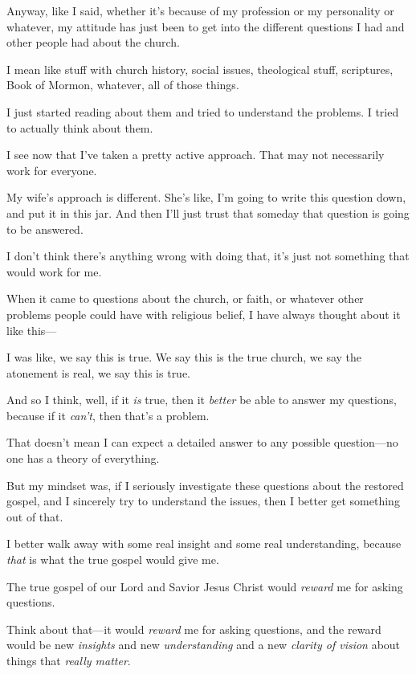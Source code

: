 \begin{compactitem}
			\item Anyway, like I said, whether it's because of my profession or my personality or whatever, my attitude has just been to get into the different questions I had and other people had about the church.
				\begin{compactitem}
					\item I mean like stuff with church history, social issues, theological stuff, scriptures, Book of Mormon, whatever, all of those things.
					\item I just started reading about them and tried to understand the problems. I tried to actually think about them.
					\item I see now that I've taken a pretty active approach. That may not necessarily work for everyone.
					\item My wife's approach is different. She's like, I'm going to write this question down, and put it in this jar. And then I'll just trust that someday that question is going to be answered.
					\item I don't think there's anything wrong with doing that, it's just not something that would work for me.
					\item When it came to questions about the church, or faith, or whatever other problems people could have with religious belief, I have always thought about it like this---
					\item I was like, we say this is true. We say this is the true church, we say the atonement is real, we say this is true.
					\item And so I think, well, if it \textit{is} true, then it \textit{better} be able to answer my questions, because if it \textit{can't}, then that's a problem.
					\item That doesn't mean I can expect a detailed answer to any possible question---no one has a theory of everything.
					\item But my mindset was, if I seriously investigate these questions about the restored gospel, and I sincerely try to understand the issues, then I better get something out of that.
					\item I better walk away with some real insight and some real understanding, because \textit{that} is what the true gospel would give me.
					\item The true gospel of our Lord and Savior Jesus Christ would \textit{reward} me for asking questions.
					\item Think about that---it would \textit{reward} me for asking questions, and the reward would be new \textit{insights} and new \textit{understanding} and a new \textit{clarity of vision} about things that \textit{really matter}.

\end{compactitem}
\end{compactitem}
